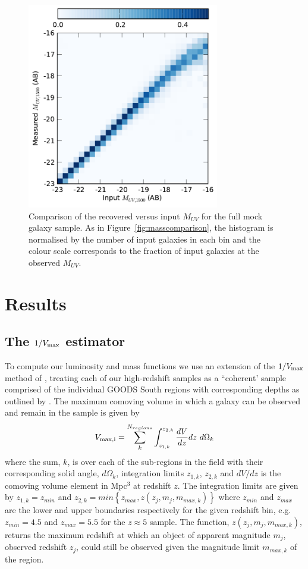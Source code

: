 \begin{figure}
\centering
\includegraphics[width=84mm]{plots/fig6.pdf}
\caption[Comparison of the recovered versus input $M_{UV}$ for the full mock galaxy sample.]{Comparison of the recovered versus input $M_{UV}$ for the full mock galaxy sample. As in Figure~\ref{fig:masscomparison}, the histogram is normalised by the number of input galaxies in each bin and the colour scale corresponds to the fraction of input galaxies at the observed $M_{UV}$.}
\label{fig:muvcomparison}
\end{figure}

\section{Results}\label{sec:results}
\subsection{The $1/V_{\rm{max}}$ estimator}\label{subsec:vmax}
To compute our luminosity and mass functions we use an extension of the $1/V_{\rm{max}}$ method of \citet{Schmidt:1968wj}, treating each of our high-redshift samples as a ``coherent' sample comprised of the individual GOODS South regions with corresponding depths as outlined by \citet{1980ApJ...235..694A,1993ApJ...404...51E,2005A&A...439..863I}. The maximum comoving volume in which a galaxy can be observed and remain in the sample is given by
\begin{equation}
V_{\rm{max},i} =  \sum_{k}^{N_{regions}} \int_{z_{1,k}}^{z_{2,k}} \frac{dV}{dz} dz~d\Omega_{k}
\end{equation}
where the sum, $k$, is over each of the sub-regions in the field with their corresponding solid angle, $d\Omega_{k}$, integration limits $z_{1,k}$, $z_{2,k}$ and $dV/dz$ is the comoving volume element in Mpc$^{3}$ at redshift $z$.
The integration limits are given by $z_{1,k} = z_{min}$ and $z_{2,k} = min \left \{z_{max},z(z_{j},m_{j},m_{max,k}) \right \}$ where $z_{min}$ and $z_{max}$ are the lower and upper boundaries respectively for the given redshift bin, e.g. $z_{min} = 4.5$ and $z_{max} = 5.5$ for the $z\approx5$ sample. The function, $z(z_{j},m_{j},m_{max,k})$, returns the maximum redshift at which an object of apparent magnitude $m_{j}$, observed redshift $z_{j}$, could still be observed given the magnitude limit $m_{max,k}$ of the region.

